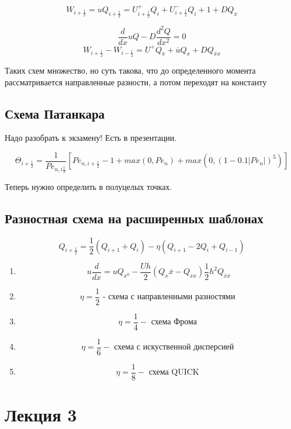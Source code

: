 \documentclass[12pt, a4paper]{article}
\begin{document}
\[ W_{i+\frac{1}{2}} = u Q_{i+\frac{1}{2}} = U^+_{i+\frac{1}{2}} Q_i + U^-_{i+\frac{1}{2}} Q_i+1 + D Q_x \]

\[ \frac{d }{dx }u Q - D \frac{d^2Q }{dx^2} = 0 \]
\[ W_{i+\frac{1}{2}} - W_{i-\frac{1}{2}} = U^+ Q_{\overline{x}} + \overline{u} Q_x + D Q_{\overline{x}x} \]

Таких схем множество, но суть такова, что до определенного момента рассматривается направленные разности, а потом переходят на константу

\subsection{Схема Патанкара}

Надо разобрать к экзамену! Есть в презентации.

\[ \Theta_{i+\frac{1}{2}} = \frac{1}{{Pe}_{n, i \frac{1}{2}}}[{Pe}_{n, i+\frac{1}{2}} - 1 + max(0, {Pe}_n) + max(0, (1 - 0.1 |{Pe}_n|)^5)] \]

Теперь нужно определить в полуцелых точках.

\subsection{Разностная схема на расширенных шаблонах}

\[ Q_{i+\frac{1}{2}} = \frac{1}{2} (Q_{i+1} + Q_{i}) - \eta ( Q_{i+1} - 2 Q_i + Q_{i-1}) \]

\begin{enumerate}
	\item \[ u \frac{d }{dx} = u Q_{x^0} -\frac{U h }{2}( Q_x \overline{x} - Q_{x x})    \frac{1}{2} h^2 Q_{\overline{x} \overline{x} } \]

	\item
	\[ \eta = \frac{1}{2} \textrm{ - схема с направленными разностями } \]

	\item
	\[ \eta = \frac{1}{4} -\textrm{  схема Фрома } \]
	\item
	\[ \eta = \frac{1}{6} -\textrm{  схема с искуственной дисперсией }\]
	\item
	\[ \eta = \frac{1}{8} -\textrm{  схема QUICK  }\]

\end{enumerate}

\section{Лекция 3}
\end{document}

